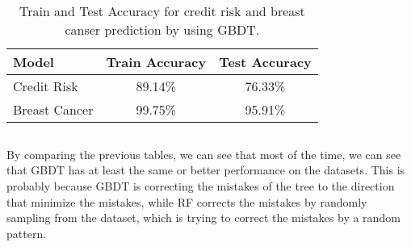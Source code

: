 \documentclass{article}
\begin{document}
\subsection{}
\begin{table}[htbp]
  \centering
  \caption{Train and Test Accuracy for credit risk and breast canser prediction by using GBDT.}
  \label{tab:rmse-comparison}
  \begin{tabular}{lcc}
    \toprule
    \textbf{Model}            & \textbf{Train Accuracy} & \textbf{Test Accuracy} \\
    \midrule
    Credit Risk               & 89.14\%                & 76.33\%               \\
    Breast Cancer         & 99.75\%               & 95.91\%               \\
    \bottomrule
  \end{tabular}
\end{table}
\subsection{}
By comparing the previous tables, we can see that most of the time, we can see that GBDT has at least the same or better performance on the datasets. This is probably because GBDT is correcting the mistakes of the tree to the direction that minimize the mistakes, while RF corrects the mistakes by randomly sampling from the dataset, which is trying to correct the mistakes by a random pattern.
\end{document}

